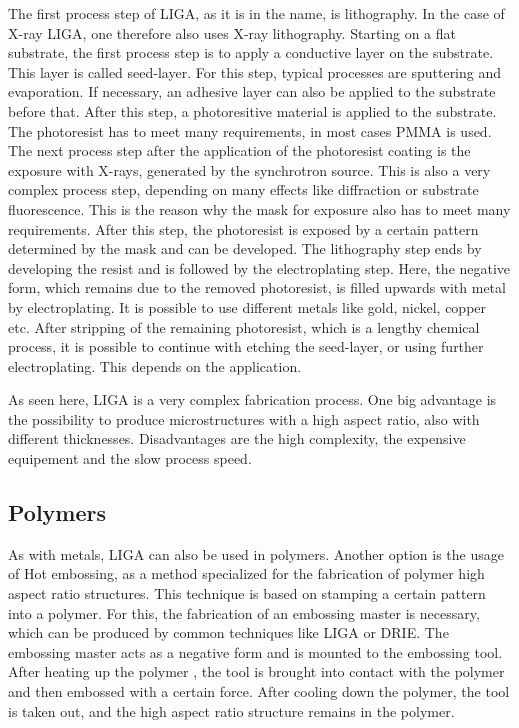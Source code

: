 \documentclass[a4paper,
  twoside, %
  headlines=2.1 %
  ]{scrartcl}
\begin{document}
The first process step of LIGA, as it is in the name, is lithography. In the case of X-ray LIGA, one therefore also uses X-ray lithography. Starting on a flat substrate, the first process step is to apply a conductive layer on the substrate. This layer is called seed-layer. For this step, typical processes are sputtering and evaporation. If necessary, an adhesive layer can also be applied to the substrate before that. After this step, a photoresitive material is applied to the substrate. The photoresist has to meet many requirements, in most cases PMMA is used. The next process step after the application of the photoresist coating is the exposure with X-rays, generated by the synchrotron source. This is also a very complex process step, depending on many effects like diffraction or substrate fluorescence. This is the reason why the mask for exposure also has to meet many requirements. After this step, the photoresist is exposed by a certain pattern determined by the mask and can be developed. The lithography step ends by developing the resist and is followed by the electroplating step. Here, the negative form, which remains due to the removed photoresist, is filled upwards with metal by electroplating. It is possible to use different metals like gold, nickel, copper etc. After stripping of the remaining photoresist, which is a lengthy chemical process, it is possible to continue with etching the seed-layer, or using further electroplating. This depends on the application. \cite{BECKER198635, menz2005paul}

As seen here, LIGA is a very complex fabrication process. One big advantage is the possibility to produce microstructures with a high aspect ratio, also with different thicknesses. Disadvantages are the high complexity, the expensive equipement and the slow process speed.

\subsection{Polymers}
As with metals, LIGA can also be used in polymers. Another option is the usage of Hot embossing, as a method specialized for the fabrication of polymer high aspect ratio structures. This technique is based on stamping a certain pattern into a polymer. For this, the fabrication of an embossing master is necessary, which can be produced by common techniques like LIGA or DRIE. The embossing master acts as a negative form and is mounted to the embossing tool. After heating up the polymer , the tool is brought into contact with the polymer and then embossed with a certain force. After cooling down the polymer, the tool is taken out, and the high aspect ratio structure remains in the polymer. \cite{BECKER2000130}
\end{document}
